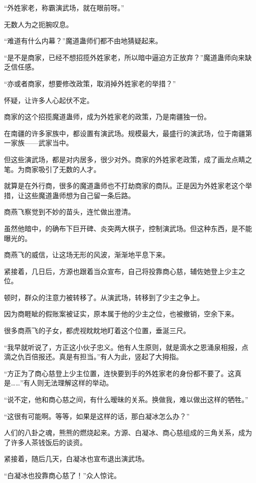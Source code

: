 \begin{this_body}
“外姓家老，称霸演武场，就在眼前呀。”

无数人为之扼腕叹息。

“难道有什么内幕？”魔道蛊师们都不由地猜疑起来。

“是不是商家，已经不想招揽外姓家老，所以暗中逼迫方正放弃？”魔道蛊师向来缺乏信任感。

“亦或者商家，想要修改政策，取消掉外姓家老的举措？”

怀疑，让许多人心起伏不定。

商家的这个招揽魔道蛊师，成为外姓家老的政策，乃是南疆独一份。

在南疆的许多家族中，都设置有演武场。规模最大，最盛行的演武场，位于南疆第一家族——武家当中。

但这些演武场，都是对内居多，很少对外。商家的外姓家老政策，成了画龙点睛之笔。为商家吸引了无数的人才。

就算是在外行商，很多的魔道蛊师也不打劫商家的商队。正是因为外姓家老这个举措，让这些魔道蛊师想为自己留一条后路。

商燕飞察觉到不妙的苗头，连忙做出澄清。

虽然他暗中，的确布下巨开碑、炎突两大棋子，控制演武场。但这种东西，是不能曝光的。

商燕飞的威信，让这场无形的风波，渐渐地平息下来。

紧接着，几日后，方源也跟着当众宣布，自己将投靠商心慈，辅佐她登上少主之位。

顿时，群众的注意力被转移了。从演武场，转移到了少主之争上。

因为商睚眦的假账案被证实，原本属于他的少主之位，也被撤销，空余下来。

很多商燕飞的子女，都虎视眈眈地盯着这个位置，垂涎三尺。

“我早就听说了，方正这小伙子忠义。他有人生原则，就是滴水之恩涌泉相报，点滴之仇百倍报还。真是有担当。”有人为此，竖起了大拇指。

“方正为了商心慈登上少主位置，连快要到手的外姓家老的身份都不要了。这真是……”有人则无法理解这样的举动。

“说不定，他和商心慈之间，有什么暧昧的关系。换做我，难以做出这样的牺牲。”

“这很有可能啊。等等，如果是这样的话，那白凝冰怎么办？”

人们的八卦之魂，熊熊的燃烧起来。方源、白凝冰、商心慈组成的三角关系，成为了许多人茶钱饭后的谈资。

紧接着，随后几天，白凝冰也宣布退出演武场。

“白凝冰也投靠商心慈了！”众人惊诧。


\end{this_body}
